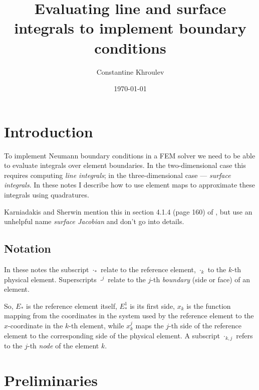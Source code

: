 \documentclass[11pt]{article}
\author{Constantine Khroulev}
\date{\today}
\title{Evaluating line and surface integrals to implement boundary conditions}
\begin{document}
\maketitle
\tableofcontents

\newcommand{\dx}{\Delta x}
\newcommand{\dy}{\Delta y}
\newcommand{\Real}{\mathbb{R}}
\newcommand{\diff}[2]{\frac{\partial #1}{\partial #2}}
\newcommand{\Diff}[2]{\frac{d #1}{d #2}}
\newcommand{\rs}{\diff{\Fk{\R}}{s}}
\newcommand{\rt}{\diff{\Fk{\R}}{t}}
\newcommand{\R}{\mathbf{r}}
\newcommand{\N}{\mathbf{n}}

\section{Introduction}
\label{sec-1}

To implement Neumann boundary conditions in a FEM solver we need to be
able to evaluate integrals over element boundaries. In the
two-dimensional case this requires computing \emph{line integrals}; in
the three-dimensional case --- \emph{surface integrals}. In these
notes I describe how to use element maps to approximate these
integrals using quadratures.

Karniadakis and Sherwin mention this in section 4.1.4 (page 160) of
\cite{KarniadakisSherwin}, but use an unhelpful name \emph{surface
  Jacobian} and don't go into details.

\subsection{Notation}
\label{sec:notation}

In these notes the subscript $\cdot_{*}$ relate to the reference
element, $\cdot_{k}$ to the $k$-th physical element. Superscripts
$\cdot^{j}$ relate to the $j$-th \emph{boundary} (side or face) of an element.

So, $E_{*}$ is the reference element itself, $E_{*}^{1}$ is its first
side, $x_{k}$ is the function mapping from the coordinates in the
system used by the reference element to the $x$-coordinate in the
$k$-th element, while $x_{k}^{j}$ maps the $j$-th side of the reference
element to the corresponding side of the physical element. A subscript
$\cdot_{k,j}$ refers to the $j$-th \emph{node} of the element $k$.

\section{Preliminaries}
\label{sec-2}
\end{document}

